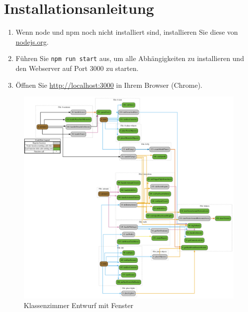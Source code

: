 \section{Installationsanleitung}

\begin{enumerate}
  \item Wenn node und npm noch nicht installiert sind, installieren Sie diese von \href{https://nodejs.org/en/}{nodejs.org}.
  \item Führen Sie \texttt{npm run start} aus, um alle Abhängigkeiten zu installieren und den Webserver auf Port 3000 zu starten.
  \item Öffnen Sie \href{http://localhost:3000}{http://localhost:3000} in Ihrem Browser (Chrome).
\end{enumerate}

\begin{figure}[H]
  \centering
  \includegraphics[width=1\textwidth]{images/function-call-graph.pdf}
  \caption{Klassenzimmer Entwurf mit Fenster}
  \label{fig:Entwurf}
\end{figure}\noindent